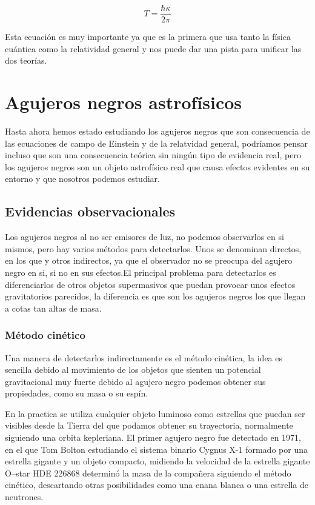 \documentclass{article}
\begin{document}
\begin{equation}
    T=\frac{\hbar\kappa}{2\pi}
\end{equation}

Esta ecuación es muy importante ya que es la primera que usa tanto la física cuántica como la relatividad general y nos puede dar una pista para unificar las dos teorías.

\section{Agujeros negros astrofísicos}

Hasta ahora hemos estado estudiando los agujeros negros que son consecuencia de las ecuaciones de campo de Einstein y de la relatvidad general, podríamos pensar incluso que son una consecuencia teórica sin ningún tipo de evidencia real, pero los agujeros negros son un objeto astrofísico real que causa efectos evidentes en su entorno y que nosotros podemos estudiar.

\subsection{Evidencias observacionales}
Los agujeros negros al no ser emisores de luz, no podemos observarlos en si mismos, pero hay varios métodos para detectarlos. Unos se denominan directos, en los que  y otros indirectos, ya que el observador no se preocupa del agujero negro en si, si no en sus efectos.\cite{muller2007experimental}El principal problema para detectarlos es diferenciarlos de otros objetos supermasivos que puedan provocar unos efectos gravitatorios parecidos, la diferencia es que son los agujeros negros los que llegan a cotas tan altas de masa.

\subsubsection{Método cinético}
Una manera de detectarlos indirectamente es el método cinética, la idea es sencilla debido al movimiento de los objetos que sienten un potencial gravitacional muy fuerte debido al agujero negro podemos obtener sus propiedades, como su masa o su espín.\cite{muller2007experimental}

En la practica se utiliza cualquier objeto luminoso como estrellas que puedan ser visibles desde la Tierra del que podamos obtener su trayectoria, normalmente siguiendo una orbita kepleriana. El primer agujero negro fue detectado en 1971, en el que Tom Bolton estudiando el sistema binario Cygnus X-1 formado por una estrella gigante y un objeto compacto, midiendo la velocidad de la estrella gigante O–star HDE 226868 determinó la masa de la compañera siguiendo el método cinético, descartando otras posibilidades como una enana blanca o una estrella de neutrones.\cite{muller2007experimental}
\end{document}
